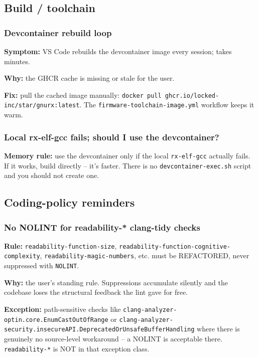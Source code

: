 \subsection{Build / toolchain}

\subsubsection{Devcontainer rebuild loop}

\textbf{Symptom:} VS Code rebuilds the devcontainer image every
session; takes minutes.

\textbf{Why:} the GHCR cache is missing or stale for the user.

\textbf{Fix:} pull the cached image manually:
\texttt{docker pull ghcr.io/locked-inc/star/gnurx:latest}. The
\texttt{firmware-toolchain-image.yml} workflow keeps it warm.

\subsubsection{Local rx-elf-gcc fails; should I use the devcontainer?}

\textbf{Memory rule:} use the devcontainer only if the local
\texttt{rx-elf-gcc} actually fails. If it works, build directly --
it's faster. There is no \texttt{devcontainer-exec.sh} script and
you should not create one.

\subsection{Coding-policy reminders}

\subsubsection{No NOLINT for readability-* clang-tidy checks}

\textbf{Rule:} \texttt{readability-function-size},
\texttt{readability-function-cognitive-complexity},
\texttt{readability-magic-numbers}, etc. must be REFACTORED, never
suppressed with \texttt{NOLINT}.

\textbf{Why:} the user's standing rule. Suppressions accumulate
silently and the codebase loses the structural feedback the lint
gave for free.

\textbf{Exception:} path-sensitive checks like
\texttt{clang-analyzer-optin.core.EnumCastOutOfRange} or
\texttt{clang-analyzer-security.insecureAPI.DeprecatedOrUnsafeBufferHandling}
where there is genuinely no source-level workaround -- a NOLINT is
acceptable there. \texttt{readability-*} is NOT in that exception class.

